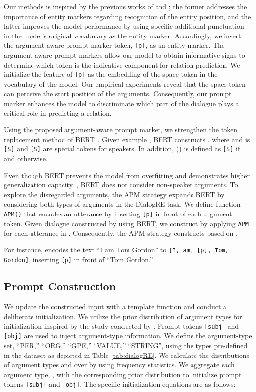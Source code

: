 \documentclass[11pt]{article}
\begin{document}
Our methods is inspired by the previous works of \citet{soares2019matching} and \citet{han2021ptr}; the former addresses the importance of entity markers regarding recognition of the entity position, and the latter improves the model performance by using specific additional punctuation in the model's original vocabulary as the entity marker. 
Accordingly, we insert the argument-aware prompt marker token, \texttt{[p]}, as an entity marker. The argument-aware prompt markers allow our model to obtain informative signs to determine which token is the indicative component for relation prediction.
We initialize the feature of \texttt{[p]} as the embedding of the space token in the vocabulary of the model. Our empirical experiments reveal that the space token can perceive the start position of the arguments. Consequently, our prompt marker enhances the model to discriminate which part of the dialogue plays a critical role in predicting a relation.


Using the proposed argument-aware prompt marker, we strengthen the token replacement method of BERT~\citep{yu-etal-2020-dialogue}. 
Given example , BERT constructs , where  and  is
 \label{equation:berts}
\texttt{[S]} and \texttt{[S]} are special tokens for speakers. In addition,  () is defined as \texttt{[S]} if  and  otherwise. 

Even though BERT prevents the model from overfitting and demonstrates higher generalization capacity~\citep{yu-etal-2020-dialogue}, BERT does not consider non-speaker arguments. To explore the disregarded arguments, the APM strategy expands BERT by considering both types of arguments in the DialogRE task.
We define function \texttt{APM()} that encodes an utterance by inserting \texttt{[p]} in front of each argument token. Given dialogue  constructed by using BERT, we construct  by applying \texttt{APM} for each utterance in . 
Consequently, the APM strategy constructs  based on .

For instance,  encodes the text ``I am Tom Gordon'' to \texttt{[I, am, [p], Tom, Gordon]}, inserting \texttt{[p]} in front of ``Tom Gordon.'' 

\subsection{Prompt Construction}
\label{subsection:prompt}
We update the constructed input  with a template function and conduct a deliberate initialization. We utilize the prior distribution of argument types for initialization inspired by the study conducted by \citet{chen2021knowprompt}. Prompt tokens \texttt{[subj]} and \texttt{[obj]} are used to inject argument-type information. We define the argument-type set, ``PER,'' ``ORG,'' ``GPE,'' ``VALUE,'' ``STRING'', using the types pre-defined in the dataset as depicted in Table \ref{tab:dialogRE}. We calculate the distributions of argument types  and  over  by using frequency statistics.
We aggregate each argument type, , with the corresponding prior distribution to initialize prompt tokens \texttt{[subj]} and \texttt{[obj]}. The specific initialization equations are as follows:
\end{document}
